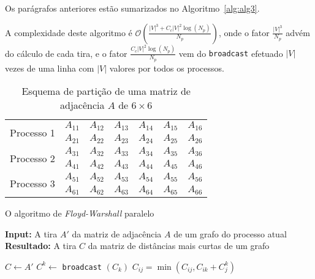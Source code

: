 \documentclass[10pt,a4paper,oneside]{article}
\newcommand{\BigO}[1]{\mathcal{O}(#1)}
\begin{document}
Os parágrafos anteriores estão sumarizados no Algoritmo~\ref{alg:alg3}.

A complexidade deste algoritmo é $\BigO{\frac{|V|^3 + C_c |V|^2
    \log{(N_p)}}{N_p}}$, onde o fator $\frac{|V|^3}{N_p}$ advém do
cálculo de cada tira, e o fator $\frac{C_c |V|^2 \log{(N_p)}}{N_p}$ vem
do {\tt broadcast} efetuado $|V|$ vezes de uma linha com $|V|$ valores
por todos os processos.

\begin{table}[t]
  \centering
  \caption{Esquema de partição de uma matriz de adjacência $A$ de $6 \times 6$}
  \label{tbl:tbl2}
  \begin{tabular}{|c|c|c|c|c|c|c|}
    \hline
    \multirow{2}{*}{Processo 1} & $A_{11}$ & $A_{12}$ & $A_{13}$ & $A_{14}$ & $A_{15}$ & $A_{16}$ \\ \cline{2-7}
    & $A_{21}$ & $A_{22}$ & $A_{23}$ & $A_{24}$ & $A_{25}$ & $A_{26}$ \\ \hline \hline
    \multirow{2}{*}{Processo 2} & $A_{31}$ & $A_{32}$ & $A_{33}$ & $A_{34}$ & $A_{35}$ & $A_{36}$ \\ \cline{2-7}
    & $A_{41}$ & $A_{42}$ & $A_{43}$ & $A_{44}$ & $A_{45}$ & $A_{46}$ \\ \hline \hline
    \multirow{2}{*}{Processo 3} & $A_{51}$ & $A_{52}$ & $A_{53}$ & $A_{54}$ & $A_{55}$ & $A_{56}$ \\ \cline{2-7}
    & $A_{61}$ & $A_{62}$ & $A_{63}$ & $A_{64}$ & $A_{65}$ & $A_{66}$ \\ \hline
  \end{tabular}
\end{table}

\begin{algorithm}[t]
\small
\caption{O algoritmo de \textit{Floyd-Warshall} paralelo}
\renewcommand{\arraystretch}{0.85}
\textbf{Input:} A tira $A'$ da matriz de adjacência $A$ de um grafo do processo atual\\
\textbf{Resultado:} A tira $C$ da matriz de distâncias mais curtas de um grafo\\
\renewcommand{\arraystretch}{1.0}
\label{alg:alg3}
\begin{algorithmic}[1]
\State $C \leftarrow A'$
 \State $C^k \leftarrow $ {\tt broadcast} $(C_k)$
      \State $C_{ij} = \min{(C_{ij}, C_{ik} + C^k_{j})}$
    \EndFor
  \EndFor
\EndFor
\end{algorithmic}
\end{algorithm}

\end{document}
